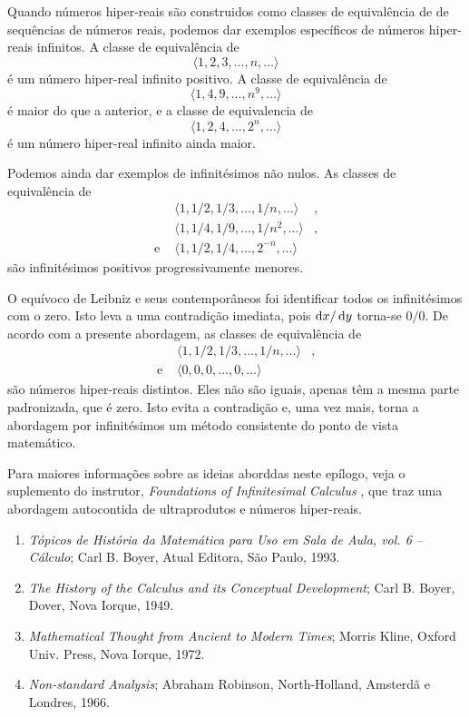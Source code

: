 Quando números hiper-reais são construidos como classes de equivalência de
de sequências de números reais, podemos dar exemplos específicos de números
hiper-reais infinitos. A classe de equivalência de
$$
  \langle 1,2,3,\ldots,n,\ldots \rangle
$$
é um número hiper-real infinito positivo. A classe de equivalência de
$$
  \langle 1,4,9,\ldots,n^9,\ldots \rangle
$$
é maior do que a anterior, e a classe de equivalencia de
$$
  \langle 1,2,4,\ldots,2^n,\ldots \rangle
$$
é um número hiper-real infinito ainda maior.

Podemos ainda dar exemplos de infinitésimos não nulos. As classes de
equivalência de
$$
  \begin{array}{rcl}
            & \langle 1,1/2,1/3,\ldots,1/n,\ldots \rangle & , \\
            & \langle 1,1/4,1/9,\ldots,1/n^2,\ldots \rangle & , \\
  \text{e } & \langle 1,1/2,1/4,\ldots,2^{-n},\ldots \rangle &
  \end{array}
$$
são infinitésimos positivos progressivamente menores.

O equívoco de Leibniz e seus contemporâneos foi identificar todos os
infinitésimos com o zero. Isto leva a uma contradição imediata, pois
$\dif{x}/\dif{y}$ torna-se $0/0$. De acordo com a presente abordagem,
as classes de equivalência de
$$
  \begin{array}{rcl}
            & \langle 1,1/2,1/3,\ldots,1/n,\ldots \rangle & , \\
  \text{e } & \langle 0, 0,  0, \ldots, 0, \ldots \rangle &
  \end{array}
$$
são números hiper-reais distintos. Eles não são iguais, apenas têm a
mesma parte padronizada, que é zero. Isto evita a contradição e, uma
vez mais, torna a abordagem por infinitésimos um método consistente
do ponto de vista matemático.

Para maiores informações sobre as ideias aborddas neste epílogo, veja
o suplemento do instrutor, \emph{Foundations of Infinitesimal Calculus}%
, que traz uma
abordagem autocontida de ultraprodutos e números hiper-reais.


\begin{enumerate}[]
\item \emph{Tópicos de História da Matemática para Uso em Sala de Aula, vol. 6 -- Cálculo}; Carl B. Boyer, Atual Editora, São Paulo, 1993.
\item \emph{The History of the Calculus and its Conceptual Development}; Carl B. Boyer, Dover, Nova Iorque, 1949.
\item \emph{Mathematical Thought from Ancient to Modern Times}; Morris Kline, Oxford Univ. Press, Nova Iorque, 1972.
\item \emph{Non-standard Analysis}; Abraham Robinson, North-Holland, Amsterdã e Londres, 1966.
\end{enumerate}


